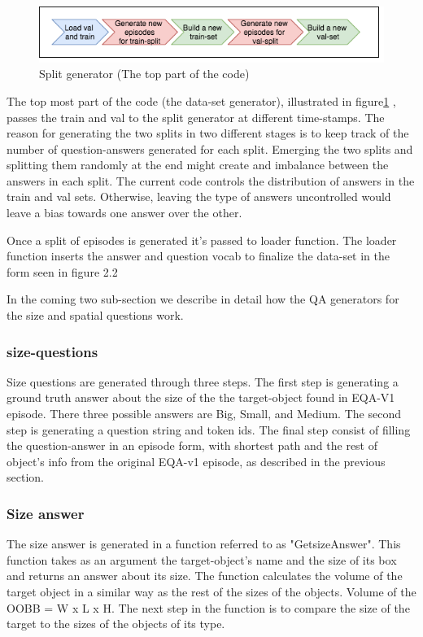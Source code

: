 \begin{figure}[H]
\includegraphics[scale=0.5]{images/stages.png}
\caption{Split generator (The top part of the code)}
\label{fig:stages}
\end{figure}


The top most part of the code (the data-set generator), illustrated in figure\ref{fig:stages} , passes the train and val to the split generator at different time-stamps. The reason for generating the two splits in two different stages is to keep track of the number of question-answers generated for each split. Emerging the two splits and splitting them randomly at the end might create and imbalance between the  answers in each split. The current code controls the distribution of answers in the train and val sets. Otherwise, leaving the type of answers uncontrolled would leave a bias towards one answer over the other. 

Once a split of episodes is generated it's passed to loader function. The loader function inserts the answer and question vocab to finalize the data-set in the form seen in figure 2.2

 In the coming two sub-section we describe in detail how the QA generators for the size and spatial questions work. 

\subsubsection{size-questions}

Size questions are generated through three steps. The first step is generating a ground truth answer about the size of the the target-object found in EQA-V1 episode. There three possible answers are  Big, Small, and Medium. The second step is generating a question string and token ids. The final step consist of filling the question-answer in an episode form, with shortest path and the rest of object's info from the original EQA-v1 episode, as described in the previous section. 

\subsubsection{Size answer} 

The size answer is generated in a function referred to as "GetsizeAnswer". This function takes as an argument the target-object's name and the size of its box and returns an answer about its size. The function calculates the volume of the target object in a similar way as the rest of the sizes of the objects. Volume of the OOBB = W x L x H. The next step in the function is to compare the size of the target to the sizes of the objects of its type.


